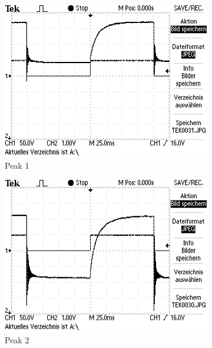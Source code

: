 \begin{figure}[h]
	\centering
	\begin{subfigure}[c]{0.45\textwidth}
	\begin{center}
	\includegraphics[width=\textwidth]{./picture/Peak_1.JPG}
	\end{center}
	\caption{Peak 1}
	\label{fig:}
	\end{subfigure}
	\begin{subfigure}[c]{0.45\textwidth}
	\begin{center}
	\includegraphics[width=\textwidth]{./picture/Peak_2.JPG}
	\end{center}
	\caption{Peak 2}
	\label{fig:}
	\end{subfigure}
	\caption{}
	\label{fig:}
\end{figure}

